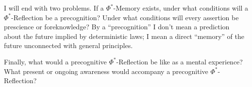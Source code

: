 I will end with two problems. If a $\Phi^*$-Memory exists, under what 
conditions will a $\Phi^*$-Reflection be a precognition? Under what conditions 
will every assertion be prescience or foreknowledge? By a \enquote{precognition} I 
don't mean a prediction about the future implied by deterministic laws; I 
mean a direct \enquote{memory} of the future unconnected with general principles. 

Finally, what would a precognitive $\Phi^*$-Reflection be like as a mental 
experience? What present or ongoing awareness would accompany a 
precognitive $\Phi^*$-Reflection? 

